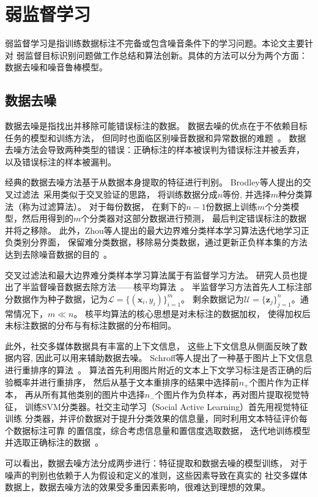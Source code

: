\documentclass[doctor]{ustcthesis}
\def \x {\mathbf{x}}
\def \z {\mathbf{z}}
\def \L {\mathcal{L}}
\def \U {\mathcal{U}}
\begin{document}
\section{弱监督学习}
弱监督学习是指训练数据标注不完备或包含噪音条件下的学习问题。本论文主要针对
弱监督目标识别问题做工作总结和算法创新。具体的方法可以分为两个方面：
数据去噪和噪音鲁棒模型。

\subsection{数据去噪}
\label{sec:data-cleaning}
数据去噪是指找出并移除可能错误标注的数据。
数据去噪的优点在于不依赖目标任务的模型和训练方法，
但同时也面临区别噪音数据和异常数据的难题~\cite{danyluk2014small}。
数据去噪方法会导致两种类型的错误：正确标注的样本被误判为错误标注并被丢弃，
以及错误标注的样本被漏判。

经典的数据去噪方法基于从数据本身提取的特征进行判别。
Brodley等人提出的交叉过滤法~\cite{brodley1999identifying}采用类似于交叉验证的思路，
将训练数据分成$n$等份, 并选择$m$种分类算法（称为过滤算法）。 对于每份数据，
在剩下的$n-1$份数据上训练$m$个分类模型，然后用得到的$m$个分类器对这部分数据进行预测，
最后判定错误标注的数据并将之移除。
此外，Zhou等人提出的最大边界难分类样本学习算法迭代地学习正负类别分界面，
保留难分类数据，移除易分类数据，通过更新正负样本集的方法
达到去除噪音数据的目的~\cite{zhou2015conceptlearner}。

交叉过滤法和最大边界难分类样本学习算法属于有监督学习方法。
研究人员也提出了半监督噪音数据去除方法——核平均算法~\cite{huang2006correcting,vo2015deep}。
半监督学习方法首先人工标注部分数据作为种子数据，记为$\L = \{(\x_i, y_i)\}_{i=1}^m$。
剩余数据记为$\U = \{\z_j\}_{j=1}^n$。通常情况下，$m \ll n$。
核平均算法的核心思想是对未标注的数据加权，
使得加权后未标注数据的分布与有标注数据的分布相同。

此外，社交多媒体数据具有丰富的上下文信息，
这些上下文信息从侧面反映了数据内容, 因此可以用来辅助数据去噪。
Schroff等人提出了一种基于图片上下文信息进行重排序的算法~\cite{schroff2011harvesting}。
算法首先利用图片附近的文本上下文学习标注是否正确的后验概率并进行重排序，
然后从基于文本重排序的结果中选择前$n_+$个图片作为正样本，
再从所有其他类别的图片中选择$n_-$个图片作为负样本，再对图片提取视觉特征，
训练SVM分类器。社交主动学习（Social Active Learning）首先用视觉特征训练
分类器，并评价数据对于提升分类效果的信息量，同时利用文本特征评价每个数据标注可靠
的置信度，综合考虑信息量和置信度选取数据，
迭代地训练模型并选取正确标注的数据~\cite{chatzilarisalic}。

可以看出，数据去噪方法分成两步进行：特征提取和数据去噪的模型训练，
对于噪声的判别也依赖于人为假设和定义的准则，这些因素导致在真实的
社交多媒体数据上，数据去噪方法的效果受多重因素影响，很难达到理想的效果。
\end{document}
